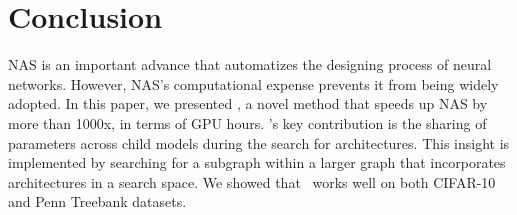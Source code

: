 \section{\label{sec:conclusion}Conclusion}
NAS is an important advance that automatizes the designing process of neural networks. However, NAS's computational expense prevents it from being widely adopted. In this paper, we presented \enas, a novel method that speeds up NAS by more than 1000x, in terms of GPU hours. \enas's key contribution is the sharing of parameters across child models during the search for architectures. This insight is implemented by searching for a subgraph within a larger graph that incorporates architectures in a search space. We showed that \enas~works well on both CIFAR-10 and Penn Treebank datasets.
